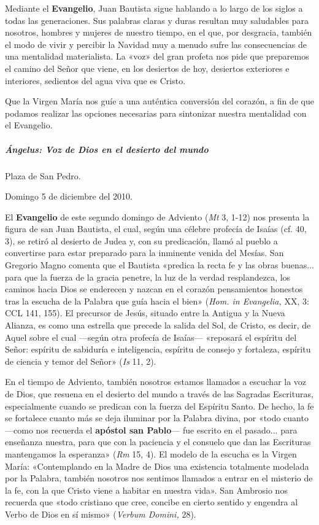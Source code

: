 \documentclass[]{article}
\let\oldsubparagraph\subparagraph
\renewcommand{\subparagraph}[1]{\oldsubparagraph{#1}\mbox{}}
\begin{document}
Mediante el \textbf{Evangelio}, Juan Bautista sigue hablando a lo largo
de los siglos a todas las generaciones. Sus palabras claras y duras
resultan muy saludables para nosotros, hombres y mujeres de nuestro
tiempo, en el que, por desgracia, también el modo de vivir y percibir la
Navidad muy a menudo sufre las consecuencias de una mentalidad
materialista. La «voz» del gran profeta nos pide que preparemos el
camino del Señor que viene, en los desiertos de hoy, desiertos
exteriores e interiores, sedientos del agua viva que es Cristo.

Que la Virgen María nos guíe a una auténtica conversión del corazón, a
fin de que podamos realizar las opciones necesarias para sintonizar
nuestra mentalidad con el Evangelio.

\subparagraph{Ángelus: Voz de Dios en el desierto del
mundo}\label{uxe1ngelus-voz-de-dios-en-el-desierto-del-mundo}

Plaza de San Pedro.

Domingo 5 de diciembre del 2010.

El \textbf{Evangelio} de este segundo domingo de Adviento (\emph{Mt} 3,
1-12) nos presenta la figura de san Juan Bautista, el cual, según una
célebre profecía de Isaías (cf. 40, 3), se retiró al desierto de Judea
y, con su predicación, llamó al pueblo a convertirse para estar
preparado para la inminente venida del Mesías. San Gregorio Magno
comenta que el Bautista «predica la recta fe y las obras buenas... para
que la fuerza de la gracia penetre, la luz de la verdad resplandezca,
los caminos hacia Dios se enderecen y nazcan en el corazón pensamientos
honestos tras la escucha de la Palabra que guía hacia el bien»
(\emph{Hom. in Evangelia,} XX, 3: CCL 141, 155). El precursor de Jesús,
situado entre la Antigua y la Nueva Alianza, es como una estrella que
precede la salida del Sol, de Cristo, es decir, de Aquel sobre el cual
---según otra profecía de Isaías--- «reposará el espíritu del Señor:
espíritu de sabiduría e inteligencia, espíritu de consejo y fortaleza,
espíritu de ciencia y temor del Señor» (\emph{Is} 11, 2).

En el tiempo de Adviento, también nosotros estamos llamados a escuchar
la voz de Dios, que resuena en el desierto del mundo a través de las
Sagradas Escrituras, especialmente cuando se predican con la fuerza del
Espíritu Santo. De hecho, la fe se fortalece cuanto más se deja iluminar
por la Palabra divina, por «todo cuanto ---como nos recuerda el
\textbf{apóstol san Pablo}--- fue escrito en el pasado... para enseñanza
nuestra, para que con la paciencia y el consuelo que dan las Escrituras
mantengamos la esperanza» (\emph{Rm} 15, 4). El modelo de la escucha es
la Virgen María: «Contemplando en la Madre de Dios una existencia
totalmente modelada por la Palabra, también nosotros nos sentimos
llamados a entrar en el misterio de la fe, con la que Cristo viene a
habitar en nuestra vida». San Ambrosio nos recuerda que «todo cristiano
que cree, concibe en cierto sentido y engendra al Verbo de Dios en sí
mismo» (\emph{Verbum Domini,} 28).
\end{document}

